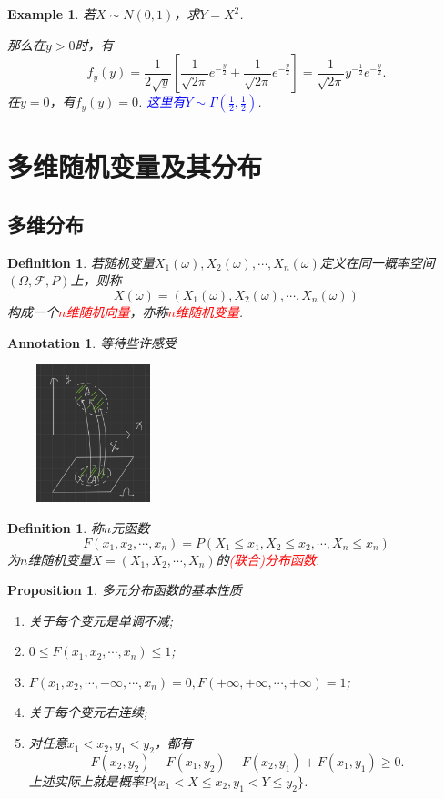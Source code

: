 \documentclass{article}
\newtheorem{proposition}[theorem]{Proposition}
\newtheorem{example}[theorem]{Example}
\newtheorem{definition}[theorem]{Definition}
\newtheorem{annotation}[theorem]{Annotation}
\newcommand{\redt}[1]{\textcolor{red}{#1}}
\newcommand{\bluet}[1]{\textcolor{blue}{#1}}
\begin{document}
\begin{example}\label{normal-distribution-square}
\rm 若$X \sim N(0,1)$，求$Y=X^2$.

那么在$y > 0$时，有
$$
f_y(y) = \frac{1}{2\sqrt{y}}\left[ \frac{1}{\sqrt{2\pi}} e^{-\frac{y}{2}} + \frac{1}{\sqrt{2\pi}} e^{-\frac{y}{2}} \right] = \frac{1}{\sqrt{2\pi}}y^{-\frac{1}{2}}e^{-\frac{y}{2}}. 
$$
在$y=0$，有$f_y(y) = 0$. \bluet{这里有$Y \sim \Gamma(\frac{1}{2},\frac{1}{2})$}.
\end{example}


\newpage
\section{多维随机变量及其分布}

\subsection{多维分布}
\begin{definition}
\rm 若随机变量$X_1(\omega),X_2(\omega),\cdots,X_n(\omega)$定义在同一概率空间$(\Omega,\mathscr{F},P)$上，则称
$$
X(\omega) = (X_1(\omega),X_2(\omega),\cdots,X_n(\omega))
$$
构成一个\redt{$n$维随机向量}，亦称\redt{$n$维随机变量}.
\end{definition}

\begin{annotation}
\rm 等待些许感受
\begin{center}
\includegraphics[width=5cm, height=4cm]{images/random_vector.jpg}
\end{center}
\end{annotation}

\begin{definition}
\rm 称$n$元函数
$$
F(x_1,x_2,\cdots,x_n) = P(X_1 \leq x_1, X_2 \leq x_2,\cdots, X_n \leq x_n)
$$
为$n$维随机变量$X=(X_1,X_2,\cdots,X_n)$的\redt{(联合)分布函数}. 
\end{definition}

\begin{proposition}
\rm 多元分布函数的基本性质
\begin{enumerate}
	\item 关于每个变元是单调不减;
	\item $0 \leq F(x_1,x_2,\cdots,x_n) \leq 1$;
	\item $F(x_1,x_2,\cdots,-\infty,\cdots,x_n) = 0,F(+\infty,+\infty,\cdots,+\infty) = 1$;
	\item 关于每个变元右连续;
	\item 对任意$x_1 < x_2, y_1 < y_2$，都有
	$$
	F(x_2,y_2)-F(x_1,y_2) - F(x_2,y_1) + F(x_1,y_1) \geq 0.
	$$
	上述实际上就是概率$P\{x_1 < X \leq x_2, y_1 < Y \leq y_2\}$.
\end{enumerate}
\end{proposition}
\end{document}
